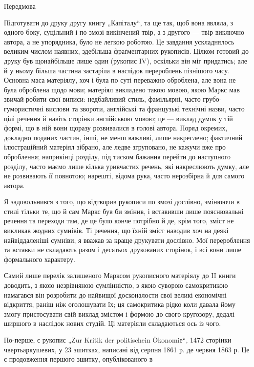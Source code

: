 Передмова

Підготувати до друку другу книгу „Капіталу“, та ще так, щоб вона
являла, з одного боку, суцільний і по змозі викінчений твір, а з другого
— твір виключно автора, а не упорядника, було не легкою роботою.
Це завдання ускладнялось великим числом наявних, здебільша фраґментарних
рукописів. Цілком готовий до друку був щонайбільше лише один
(рукопис IV), оскільки він міг придатись; але й у ньому більша частина
застаріла в наслідок перероблень пізнішого часу. Основна маса матеріялу,
хоч і була по суті переважно оброблена, але вона не була оброблена щодо
мови; матеріял викладено такою мовою, якою Маркс мав звичай робити свої
виписи: недбайливий стиль, фамільярні, часто грубо-гумористичні вислови
та звороти, англійські та французькі технічні назви, часто цілі речення
й навіть сторінки англійською мовою; це — виклад думок у тій формі,
що в ній вони щоразу розвивалися в голові автора. Поряд окремих,
докладно поданих частин, інші, не менш важливі, лише накреслено; фактичний
ілюстраційний матеріял зібрано, але ледве згруповано, не кажучи
вже про оброблення; наприкінці розділу, під тиском бажання перейти до
наступного розділу, часто маємо лише кілька уривчастих речень, які накреслюють
думку, але не розвивають її повнотою; нарешті, відома рука,
часто нерозбірна й для самого автора.

Я задовольнився з того, що відтворив рукописи по змозі дослівно,
змінюючи в стилі тільки те, що й сам Маркс був би змінив, і вставивши
лише пояснювальні речення та переходи там, де це було конче потрібно
й де, крім того, зміст не викликав жодних сумнівів. Ті речення, що їхній
зміст наводив хоч на деякі найвіддаленіші сумніви, я вважав за краще
друкувати дослівно. Мої перероблення та вставки не складають разом і
десятьох друкованих сторінок, і всі вони лише формального характеру.

Самий лише перелік залишеного Марксом рукописного матеріялу до
II книги доводить, з якою незрівняною сумлінністю, з якою суворою
самокритикою намагався він розробити до найвищої досконалости свої
великі економічні відкриття, раніш ніж оголошувати їх; ця самокритика
рідко коли давала йому змогу пристосувати свій виклад змістом і формою
до свого кругозору, дедалі ширшого в наслідок нових студій. Ці
матеріяли складаються ось із чого.

По-перше, є рукопис „Zur Kritik der politischein Ökonomiе“, 1472 сторінки
чвертьаркушевих, у 23 зшитках, написані від серпня 1861 р. де
червня 1863 р. Це є продовження першого зшитку, опублікованого в
\parbreak{}  %

